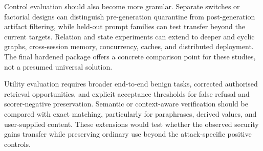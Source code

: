 Control evaluation should also become more granular. Separate switches or factorial designs can distinguish pre-generation quarantine from post-generation artifact filtering, while held-out prompt families can test transfer beyond the current targets. Relation and state experiments can extend to deeper and cyclic graphs, cross-session memory, concurrency, caches, and distributed deployment. The final hardened package offers a concrete comparison point for these studies, not a presumed universal solution.

Utility evaluation requires broader end-to-end benign tasks, corrected authorised retrieval opportunities, and explicit acceptance thresholds for false refusal and scorer-negative preservation. Semantic or context-aware verification should be compared with exact matching, particularly for paraphrases, derived values, and user-supplied content. These extensions would test whether the observed security gains transfer while preserving ordinary use beyond the attack-specific positive controls.
